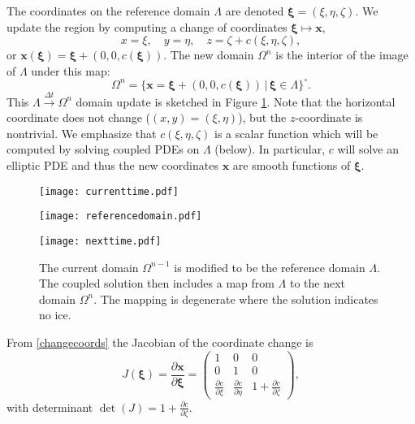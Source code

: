 \documentclass[letterpaper,final,12pt,reqno]{amsart}
\newcommand{\bx}{\mathbf{x}}
\newcommand{\bxi}{\bm{\xi}}
\begin{document}
The coordinates on the reference domain $\Lambda$ are denoted $\bxi=(\xi,\eta,\zeta)$.  We update the region by computing a change of coordinates $\bxi \mapsto \bx$,
\begin{equation}
x=\xi, \quad y=\eta, \quad z=\zeta+c(\xi,\eta,\zeta), \label{changecoords}
\end{equation}
or $\bx(\bxi) = \bxi + (0,0,c(\bxi))$.  The new domain $\Omega^n$ is the interior of the image of $\Lambda$ under this map:
\begin{equation}
\Omega^n = \{\bx=\bxi + (0,0,c(\bxi)) \,\big|\, \bxi \in \Lambda\}^\circ. \label{updateddomain}
\end{equation}
This $\Lambda \stackrel{\Delta t}{\to} \Omega^n$ domain update is sketched in Figure \ref{fig:domainupdate}.  Note that the horizontal coordinate does not change ($(x,y)=(\xi,\eta)$), but the $z$-coordinate is nontrivial.  We emphasize that $c(\xi,\eta,\zeta)$ is a scalar function which will be computed by solving coupled PDEs on $\Lambda$ (below).  In particular, $c$ will solve an elliptic PDE and thus the new coordinates $\bx$ are smooth functions of $\bxi$.

\begin{figure}[h]
\begin{center}
\texttt{[image: currenttime.pdf]}
\vspace{-3mm}

\texttt{[image: referencedomain.pdf]}

\texttt{[image: nexttime.pdf]}
\end{center}
\caption{The current domain $\Omega^{n-1}$ is modified to be the reference domain $\Lambda$.  The coupled solution then includes a map from $\Lambda$ to the next domain $\Omega^n$.  The mapping is degenerate where the solution indicates no ice.}
\label{fig:domainupdate}
\end{figure}

From \eqref{changecoords} the Jacobian of the coordinate change is
\begin{equation}
J(\bxi) = \frac{\partial \bx}{\partial \bm{\xi}} = \begin{pmatrix} 1 & 0 & 0 \\  0 & 1 & 0 \\ \frac{\partial c}{\partial \xi} & \frac{\partial c}{\partial \eta} & 1+\frac{\partial c}{\partial \zeta} \end{pmatrix}, \label{jacchange}
\end{equation}
with determinant $\det(J)=1+\frac{\partial c}{\partial \zeta}$.
\end{document}
